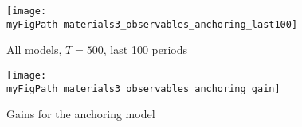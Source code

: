 \documentclass[11pt]{article}
\def \myFigPath {../figures/}
\renewcommand{\[}{\begin{equation}}
\renewcommand{\]}{\end{equation}}
\def\myFigScale{0.3}
\begin{document}
\begin{figure}[h!]
\texttt{[image: \\myFigPath materials3\_observables\_anchoring\_last100]} 
\caption{All models, $T = 500$, last 100 periods}
\end{figure}


\begin{figure}[h!]
\texttt{[image: \\myFigPath materials3\_observables\_anchoring\_gain]} 
\caption{Gains for the anchoring model}
\end{figure}
\end{document}
